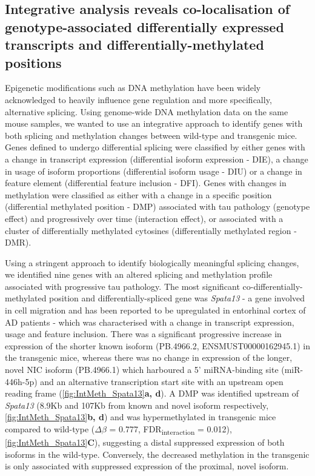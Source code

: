 \clearpage
\subsection{Integrative analysis reveals co-localisation of genotype-associated differentially expressed transcripts and differentially-methylated positions}
Epigenetic modifications such as DNA methylation have been widely acknowledged to heavily influence gene regulation and more specifically, alternative splicing. Using genome-wide DNA methylation data on the same mouse samples, we wanted to use an integrative approach to identify genes with both splicing and methylation changes between wild-type and transgenic mice. Genes defined to undergo differential splicing were classified by either genes with a change in transcript expression (differential isoform expression - DIE), a change in usage of isoform proportions (differential isoform usage - DIU) or a change in feature element (differential feature inclusion - DFI). Genes with changes in methylation were classified as either with a change in a specific position (differential methylated position - DMP) associated with tau pathology (genotype effect) and progressively over time (interaction effect), or associated with a cluster of differentially methylated cytosines (differentially methylated region - DMR). 

Using a stringent approach to identify biologically meaningful splicing changes, we identified nine genes with an altered splicing and methylation profile associated with progressive tau pathology. The most significant co-differentially-methylated position and differentially-spliced gene was \textit{Spata13} - a gene involved in cell migration\cite{Bourbia2019} and has been reported to be upregulated in entorhinal cortex of AD patients\cite{Yan2019} - which was characterised with a change in transcript expression, usage and feature inclusion. There was a significant progressive increase in expression of the shorter known isoform (PB.4966.2, ENSMUST00000162945.1) in the transgenic mice, whereas there was no change in expression of the longer, novel NIC isoform (PB.4966.1) which harboured a 5' miRNA-binding site (miR-446h-5p) and an alternative transcription start site with an upstream open reading frame (\cref{fig:IntMeth_Spata13}\textbf{a, d}). A DMP was identified upstream of \textit{Spata13} (8.9Kb and 107Kb from known and novel isoform respectively, \cref{fig:IntMeth_Spata13}\textbf{b, d}) and was hypermethylated in transgenic mice compared to wild-type ($\Delta$$\beta$ = 0.777, FDR\textsubscript{interaction} = 0.012), \cref{fig:IntMeth_Spata13}\textbf{C}), suggesting a distal suppressed expression of both isoforms in the wild-type. Conversely, the decreased methylation in the transgenic is only associated with suppressed expression of the proximal, novel isoform. 


